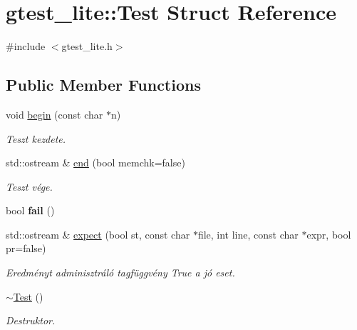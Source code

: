 \hypertarget{structgtest__lite_1_1_test}{}\section{gtest\+\_\+lite\+:\+:Test Struct Reference}
\label{structgtest__lite_1_1_test}


{\ttfamily \#include $<$gtest\+\_\+lite.\+h$>$}

\subsection*{Public Member Functions}
\begin{DoxyCompactItemize}
\item 
\mbox{\label{structgtest__lite_1_1_test_a2227b70fcc5dfb3c326bf117dd8f7e79}} 
void \hyperlink{structgtest__lite_1_1_test_a2227b70fcc5dfb3c326bf117dd8f7e79}{begin} (const char $\ast$n)
\begin{DoxyCompactList}\small\item\em Teszt kezdete. \end{DoxyCompactList}\item 
\mbox{\label{structgtest__lite_1_1_test_a658c1eee35f170294c354ebf4d3fc1ba}} 
std\+::ostream \& \hyperlink{structgtest__lite_1_1_test_a658c1eee35f170294c354ebf4d3fc1ba}{end} (bool memchk=false)
\begin{DoxyCompactList}\small\item\em Teszt vége. \end{DoxyCompactList}\item 
\mbox{\label{structgtest__lite_1_1_test_aadbfd0f53c56d975f793602996631195}} 
bool {\bfseries fail} ()
\item 
\mbox{\label{structgtest__lite_1_1_test_a0bca03315e5963f7fdfffd92d2daed6a}} 
std\+::ostream \& \hyperlink{structgtest__lite_1_1_test_a0bca03315e5963f7fdfffd92d2daed6a}{expect} (bool st, const char $\ast$file, int line, const char $\ast$expr, bool pr=false)
\begin{DoxyCompactList}\small\item\em Eredményt adminisztráló tagfüggvény True a jó eset. \end{DoxyCompactList}\item 
\mbox{\label{structgtest__lite_1_1_test_a5a879233c2aa110626668c06140f6e71}} 
\hyperlink{structgtest__lite_1_1_test_a5a879233c2aa110626668c06140f6e71}{$\sim$\+Test} ()
\begin{DoxyCompactList}\small\item\em Destruktor. \end{DoxyCompactList}\end{DoxyCompactItemize}
